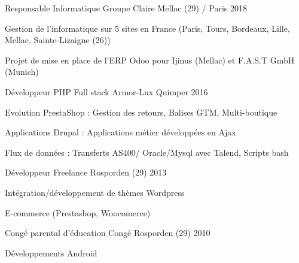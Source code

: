 \begin{cventries}
  \cventry
    {Responsable Informatique } %
    {Groupe Claire} %
    {Mellac (29) / Paris} %
    {2018} %
    {
    \begin{cvitems} %
      \item {Gestion de l’informatique sur 5 sites en France (Paris, Tours, Bordeaux, Lille, Mellac, Sainte-Lizaigne (26))}
      \item {Projet de mise en place de l’ERP Odoo pour Ijinus (Mellac) et F.A.S.T GmbH (Munich)}
    \end{cvitems}
    }

  \cventry
    {Développeur PHP Full stack} %
    {Armor-Lux } %
    {Quimper} %
    {2016} %
    {
      \begin{cvitems} %
        \item {Evolution PrestaShop : Gestion des retours, Balises GTM, Multi-boutique}
        \item {Applications Drupal : Applications métier développées en Ajax}
        \item {Flux de données : Transferts AS400/ Oracle/Mysql avec Talend, Scripts bash}
      \end{cvitems}
    }

    \cventry
    {Développeur} %
    {Freelance} %
    {Rosporden (29)} %
    {2013} %
    {
      \begin{cvitems} %
        \item {Intégration/développement de thèmes Wordpress}
        \item {E-commerce (Prestashop, Woocomerce)}
      \end{cvitems}
    }
   
    \cventry
    {Congé parental d’éducation} %
    {Congé} %
    {Rosporden (29)} %
    {2010} %
    {
      \begin{cvitems} %
        \item {Développements Android}
      \end{cvitems}
    }
  

\end{cventries}
